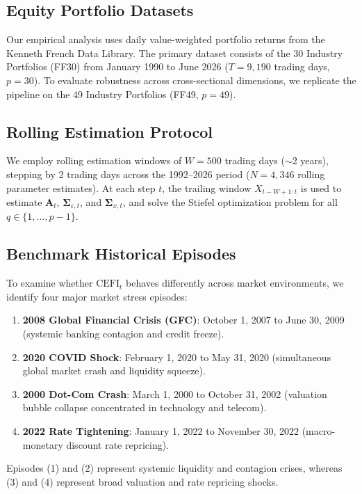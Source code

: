 \documentclass[review,12pt,authoryear]{elsarticle}
\begin{document}
\subsection{Equity Portfolio Datasets}
Our empirical analysis uses daily value-weighted portfolio returns from the Kenneth French Data Library. The primary dataset consists of the 30 Industry Portfolios (FF30) from January 1990 to June 2026 ($T = 9,190$ trading days, $p = 30$). To evaluate robustness across cross-sectional dimensions, we replicate the pipeline on the 49 Industry Portfolios (FF49, $p=49$).

\subsection{Rolling Estimation Protocol}
We employ rolling estimation windows of $W = 500$ trading days ($\sim 2$ years), stepping by 2 trading days across the 1992--2026 period ($N = 4,346$ rolling parameter estimates). At each step $t$, the trailing window $X_{t-W+1:t}$ is used to estimate $\mathbf{A}_t$, $\boldsymbol{\Sigma}_{\varepsilon,t}$, and $\boldsymbol{\Sigma}_{x,t}$, and solve the Stiefel optimization problem for all $q \in \{1, \dots, p-1\}$.

\subsection{Benchmark Historical Episodes}
To examine whether $\mathrm{CEFI}_t$ behaves differently across market environments, we identify four major market stress episodes:
\begin{enumerate}
    \item \textbf{2008 Global Financial Crisis (GFC)}: October 1, 2007 to June 30, 2009 (systemic banking contagion and credit freeze).
    \item \textbf{2020 COVID Shock}: February 1, 2020 to May 31, 2020 (simultaneous global market crash and liquidity squeeze).
    \item \textbf{2000 Dot-Com Crash}: March 1, 2000 to October 31, 2002 (valuation bubble collapse concentrated in technology and telecom).
    \item \textbf{2022 Rate Tightening}: January 1, 2022 to November 30, 2022 (macro-monetary discount rate repricing).
\end{enumerate}
Episodes (1) and (2) represent systemic liquidity and contagion crises, whereas (3) and (4) represent broad valuation and rate repricing shocks.
\end{document}
